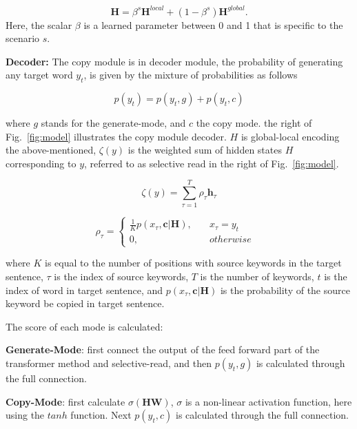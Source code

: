 \documentclass[sigconf]{acmart}
\begin{document}
\begin{equation}\label{equ:mixture}
    \mathbf{H} = \beta^s\mathbf{H}^{local} + (1-\beta^s)\mathbf{H}^{global}.
\end{equation}
Here, the scalar $\beta$ is a learned parameter between 0 and 1 that is specific to the scenario $s$.

\textbf{Decoder:} The copy module is in decoder module, the probability of generating any target word $y_t$, is given by the mixture of probabilities as follows

\begin{equation}\label{equ:mixture-prob}
    p(y_t) = p(y_t,g) + p(y_t,c)
\end{equation}

where $g$ stands for the generate-mode, and $c$ the
copy mode. the right of Fig.~\ref{fig:model} illustrates the copy module decoder. $H$ is global-local encoding the above-mentioned, $\zeta(y)$ is the weighted sum of hidden states $H$ corresponding to $y$, referred to as selective read in the right of Fig.~\ref{fig:model}. 

\begin{equation}\label{equ:zeta}
    \zeta(y) = \sum^{T}_{\tau = 1} \rho_\tau \textbf{h}_\tau 
\end{equation}

\begin{equation}\label{equ:rho}
    \rho_\tau = \left\{
        \begin{aligned}
        \frac{1}{K} p(x_\tau,\textbf{c}|\textbf{H}), \quad & x_\tau = y_t & \\
        0, \quad & otherwise &
        \end{aligned} 
        \right.
\end{equation}

where $K$ is equal to the number of positions with source keywords in the target sentence, $\tau$ is the index of source keywords, $T$ is the number of keywords, $t$ is the index of word in target sentence, and $p(x_\tau,\textbf{c}|\textbf{H})$ is the probability of the source keyword be copied in target sentence. 

The score of each mode is calculated:

\textbf{Generate-Mode}: first connect the output of the feed forward part of the transformer method and selective-read, and then $p(y_t,g)$ is calculated through the full connection. 

\textbf{Copy-Mode}: first calculate $\sigma(\textbf{H}\textbf{W})$, $\sigma$ is a non-linear activation function, here using the $tanh$ function. Next $p(y_t,c)$ is calculated through the full connection. 
\end{document}
